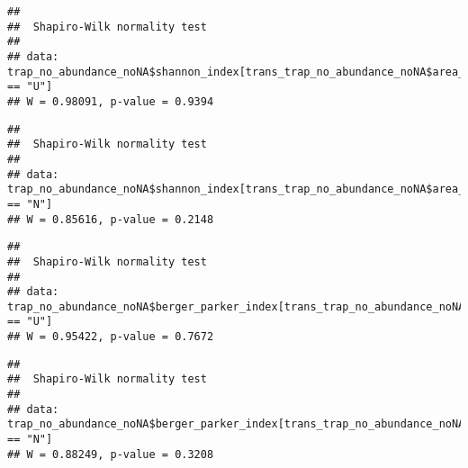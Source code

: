 \documentclass[
]{article}
\newenvironment{Shaded}{\begin{snugshade}}{\end{snugshade}}
\newcommand{\FunctionTok}[1]{\textcolor[rgb]{0.13,0.29,0.53}{\textbf{#1}}}
\newcommand{\NormalTok}[1]{#1}
\newcommand{\SpecialCharTok}[1]{\textcolor[rgb]{0.81,0.36,0.00}{\textbf{#1}}}
\newcommand{\StringTok}[1]{\textcolor[rgb]{0.31,0.60,0.02}{#1}}
\begin{document}
\begin{verbatim}
## 
##  Shapiro-Wilk normality test
## 
## data:  trap_no_abundance_noNA$shannon_index[trans_trap_no_abundance_noNA$area_type == "U"]
## W = 0.98091, p-value = 0.9394
\end{verbatim}

\begin{Shaded}
\end{Shaded}

\begin{verbatim}
## 
##  Shapiro-Wilk normality test
## 
## data:  trap_no_abundance_noNA$shannon_index[trans_trap_no_abundance_noNA$area_type == "N"]
## W = 0.85616, p-value = 0.2148
\end{verbatim}

\begin{Shaded}
\end{Shaded}

\begin{verbatim}
## 
##  Shapiro-Wilk normality test
## 
## data:  trap_no_abundance_noNA$berger_parker_index[trans_trap_no_abundance_noNA$area_type == "U"]
## W = 0.95422, p-value = 0.7672
\end{verbatim}

\begin{Shaded}
\end{Shaded}

\begin{verbatim}
## 
##  Shapiro-Wilk normality test
## 
## data:  trap_no_abundance_noNA$berger_parker_index[trans_trap_no_abundance_noNA$area_type == "N"]
## W = 0.88249, p-value = 0.3208
\end{verbatim}
\end{document}
